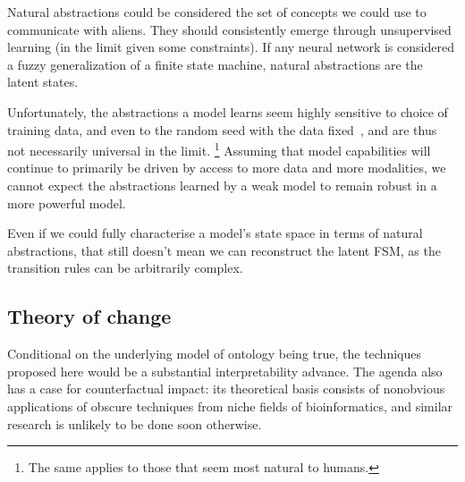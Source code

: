 Natural abstractions could be considered the set of concepts we could use to communicate with aliens. 
They should consistently emerge through unsupervised learning (in the limit given some constraints).
If any neural network is considered a fuzzy generalization of a finite state machine, 
natural abstractions are the latent states.

Unfortunately, the abstractions a model learns seem highly sensitive to choice of training data, and even to the random seed with the data fixed~\cite{chughtai2023}, and are thus not necessarily universal in the limit.
\footnote{The same applies to those that seem most natural to humans.}
Assuming that model capabilities will continue to primarily be driven by access to more data and more modalities, we cannot expect the abstractions learned by a weak model to remain robust in a more powerful model.

Even if we could fully characterise a model's state space in terms of natural abstractions,
that still doesn't mean we can reconstruct the latent FSM, 
as the transition rules can be arbitrarily complex.


\subsection{Theory of change}
Conditional on the underlying model of ontology being true, the
techniques proposed here would be a substantial interpretability
advance. The agenda also has a case for counterfactual impact: its
theoretical basis consists of nonobvious applications of obscure
techniques from niche fields of bioinformatics, and similar research
is unlikely to be done soon otherwise.

